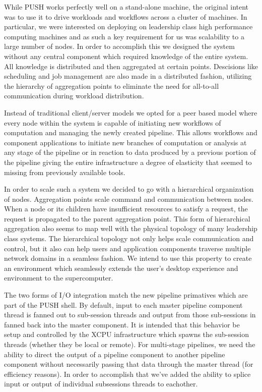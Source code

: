 While PUSH works perfectly well on a stand-alone machine, the original
intent was to use it to drive workloads and workflows across a cluster of
machines.  In particular, we were interested on deploying on leadership
class high performance computing machines and as such
a key requirement for us was scalability to a large number of nodes.  
In order to accomplish this we designed the system without any central
component which required knowledge of the entire system.
All knowledge is distributed and then aggregated at certain points.
Descisions like scheduling and job management are also made in a
distributed fashion, utilizing the hierarchy of aggregation points
to eliminate the need for all-to-all communication during workload
distribution.

Instead of traditional client/server models we opted for a peer based
model where every node within the system is capable of initiating new
workflows of computation and managing the newly created pipeline.
This allows workflows and component applications to initiate new branches
of computation or analysis at any stage of the pipeline or in reaction to
data produced by a previous portion of the pipeline giving the entire
infrastructure a degree of elasticity that seemed to missing from 
previously available tools.

In order to scale such a system we decided to go with a hierarchical
organization of nodes.  
Aggregation points scale command and communication between nodes.  
When a node or its children have insufficient resources to satisfy a request,
the request is propagated to the parent aggregation point.
This form of hierarchical aggregation also seems to map well with the 
physical topology of many leadership class systems.
The hierarchical topology not only helps scale communication and control,
but it also can help users and application components traverse multiple
network domains in a seamless fashion.
We intend to use this property to create an environment which seamlessly
extends the user's desktop experience and environment to the supercomputer.

The two forms of I/O integration match the new pipeline primatives which
are part of the PUSH shell.
By default, input to each master pipeline component thread is fanned out 
to sub-session threads and output from those sub-sessions in fanned back
into the master component.
It is intended that this behavior be setup and controlled by the XCPU
infrastructure which spawns the sub-session threads (whether they be local
or remote).
For multi-stage pipelines, we need the ability to direct the output of
a pipeline component to another pipeline component without necessarily
passing that data through the master thread (for efficiency reasons).
In order to accomplish that we've added the ability to splice input or
output of individual subsessions threads to eachother.
